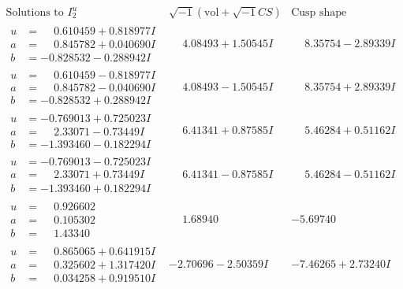 \documentclass[1p]{elsarticle_modified}
\theoremstyle{definition}
\newcommand{\I}{\sqrt{-1}}
\begin{document}
$$\begin{array}{c|c|c}  
\text{Solutions to }I^u_{2}& \I (\text{vol} + \sqrt{-1}CS) & \text{Cusp shape}\\
 \hline 
\begin{aligned}
u &= \phantom{-}0.610459 + 0.818977 I \\
a &= \phantom{-}0.845782 + 0.040690 I \\
b &= -0.828532 - 0.288942 I\end{aligned}
 & \phantom{-}4.08493 + 1.50545 I & \phantom{-}8.35754 - 2.89339 I \\ \hline\begin{aligned}
u &= \phantom{-}0.610459 - 0.818977 I \\
a &= \phantom{-}0.845782 - 0.040690 I \\
b &= -0.828532 + 0.288942 I\end{aligned}
 & \phantom{-}4.08493 - 1.50545 I & \phantom{-}8.35754 + 2.89339 I \\ \hline\begin{aligned}
u &= -0.769013 + 0.725023 I \\
a &= \phantom{-}2.33071 - 0.73449 I \\
b &= -1.393460 - 0.182294 I\end{aligned}
 & \phantom{-}6.41341 + 0.87585 I & \phantom{-}5.46284 + 0.51162 I \\ \hline\begin{aligned}
u &= -0.769013 - 0.725023 I \\
a &= \phantom{-}2.33071 + 0.73449 I \\
b &= -1.393460 + 0.182294 I\end{aligned}
 & \phantom{-}6.41341 - 0.87585 I & \phantom{-}5.46284 - 0.51162 I \\ \hline\begin{aligned}
u &= \phantom{-}0.926602\phantom{ +0.000000I} \\
a &= \phantom{-}0.105302\phantom{ +0.000000I} \\
b &= \phantom{-}1.43340\phantom{ +0.000000I}\end{aligned}
 & \phantom{-}1.68940\phantom{ +0.000000I} & -5.69740\phantom{ +0.000000I} \\ \hline\begin{aligned}
u &= \phantom{-}0.865065 + 0.641915 I \\
a &= \phantom{-}0.325602 + 1.317420 I \\
b &= \phantom{-}0.034258 + 0.919510 I\end{aligned}
 & -2.70696 - 2.50359 I & -7.46265 + 2.73240 I \\ \hline\begin{aligned}

\end{aligned}
\end{array}$$
\end{document}
